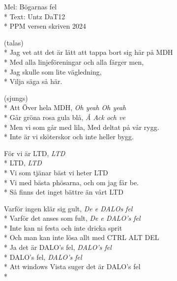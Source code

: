 \begin{SongText}
    \begin{SongInfo}
        Mel: Bögarnas fel\\*%
        Text: Untz DaT12\\*%
        PPM versen skriven 2024
    \end{SongInfo}
    \begin{SongVerse}
        (talas)\\*%
        Jag vet att det är lätt att tappa bort sig här på MDH\\*%
        Med alla linjeföreningar och alla färger men, \\*%
        Jag skulle som lite vägledning, \\*%
        Vilja säga så här.
    \end{SongVerse}
    \begin{SongVerse}
        (sjungs)\\*%
        Att Över hela MDH, \textit{Oh yeah Oh yeah}\\*%
        Går gröna rosa gula blå, \textit{Å Ack och ve}\\*%
        Men vi som går med lila, Med deltat på vår rygg.\\*%
        Inte är vi sköterskor och inte heller bygg.
    \end{SongVerse}
    \begin{SongVerse}
        För vi är LTD, \textit{LTD}\\*%
        LTD, \textit{LTD}\\*%
        Vi som tjänar bäst vi heter LTD\\*%
        Vi med bästa phösarna, och om jag får be.\\*%
        Så finns det inget bättre än vårt LTD
    \end{SongVerse}
    \begin{SongVerse}
        Varför ingen klär sig gult, \textit{De e DALOs fel}\\*%
        Varför det anses som fult, \textit{De e DALO's fel}\\*%
        Inte kan ni festa och inte dricka sprit\\*%
        Och man kan inte lösa allt med CTRL ALT DEL\\*%
        Ja det är DALO's fel, \textit{DALO's fel} \\*%
        DALO's fel, \textit{DALO's fel}\\*%
        Att windows Vista suger det är DALO's fel\\*%

\end{SongVerse}
\end{SongText}
